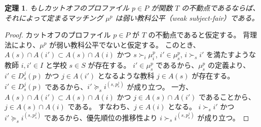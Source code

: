 \documentclass[12pt, a4paper]{article}
\theoremstyle{definition}
\theoremstyle{remark}
\theoremstyle{plain}
\newtheorem{theorem}{定理}
\begin{document}

\begin{theorem}
もしカットオフのプロファイル \( p \in P\) が関数 \( T \) の不動点であるならば、それによって定まるマッチング \( \mu^{p} \) は弱い教科公平（weak subject-fair）である。
\end{theorem}


\begin{proof}

カットオフのプロファイル \( p \in P\) が \( T \) の不動点であると仮定する。
背理法により、\( \mu^{p} \) が弱い教科公平でないと仮定する。
このとき、$A(s) \cap A(i')\subset A(s) \cap A(i)$ かつ $s \succ_i \mu_i^p$, $i' \in \mu_s^p$, $i \succ_s i'$ を満たすような教師 $i,i' \in I$ と学校 $s \in S$ が存在する。
$i' \in \mu^{p}_s$ であるから、$\mu^{p}_s$ の定義より、$i' \in D_s^j(p)$ かつ $j \in A(i')$ となるような教科 $j \in A(s)$ が存在する。
$i' \in D_s^j(p)$ であるから、$i' \succeq_s i^{(s,p_s^j)}$ が成り立つ。
一方、$A(s) \cap A(i')\subset A(s) \cap A(i)$ かつ $j \in A(s) \cap A(i')$ であることから、$j \in A(s) \cap A(i)$ である。
すなわち、$j \in A(i)$ となる。
$i \succ_s i'$ かつ $i' \succeq_s i^{(s,p_s^j)}$ であるから、優先順位の推移性より $i \succ_s i^{(s,p_s^j)}$ が成り立つ。

  


\end{proof}
\end{document}
